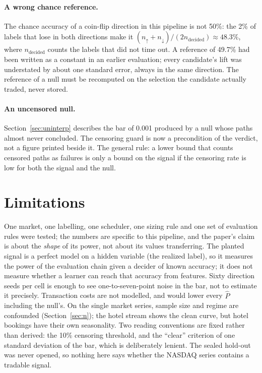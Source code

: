 \documentclass[11pt]{article}
\newcommand{\Pf}{\hat{P}}
\begin{document}
\paragraph{A wrong chance reference.}
The chance accuracy of a coin-flip direction in this pipeline is not 50\%: the 2\% of labels that lose in both directions make it $(n_{\uparrow} + n_{\downarrow}) / (2 n_{\text{decided}}) \approx 48.3\%$, where $n_{\text{decided}}$ counts the labels that did not time out. A reference of 49.7\% had been written as a constant in an earlier evaluation; every candidate's lift was understated by about one standard error, always in the same direction. The reference of a null must be recomputed on the selection the candidate actually traded, never stored.

\paragraph{An uncensored null.}
Section~\ref{sec:uninterp} describes the bar of 0.001 produced by a null whose paths almost never concluded. The censoring guard is now a precondition of the verdict, not a figure printed beside it. The general rule: a lower bound that counts censored paths as failures is only a bound on the signal if the censoring rate is low for both the signal and the null.

\section{Limitations}
\label{sec:limits}

One market, one labelling, one scheduler, one sizing rule and one set of evaluation rules were tested; the numbers are specific to this pipeline, and the paper's claim is about the \emph{shape} of its power, not about its values transferring. The planted signal is a perfect model on a hidden variable (the realized label), so it measures the power of the evaluation chain given a decider of known accuracy; it does not measure whether a learner can reach that accuracy from features. Sixty direction seeds per cell is enough to see one-to-seven-point noise in the bar, not to estimate it precisely. Transaction costs are not modelled, and would lower every $\Pf$ including the null's. On the single market series, sample size and regime are confounded (Section~\ref{sec:n}); the hotel stream shows the clean curve, but hotel bookings have their own seasonality. Two reading conventions are fixed rather than derived: the 10\% censoring threshold, and the ``clear'' criterion of one standard deviation of the bar, which is deliberately lenient. The sealed hold-out was never opened, so nothing here says whether the NASDAQ series contains a tradable signal.
\end{document}
